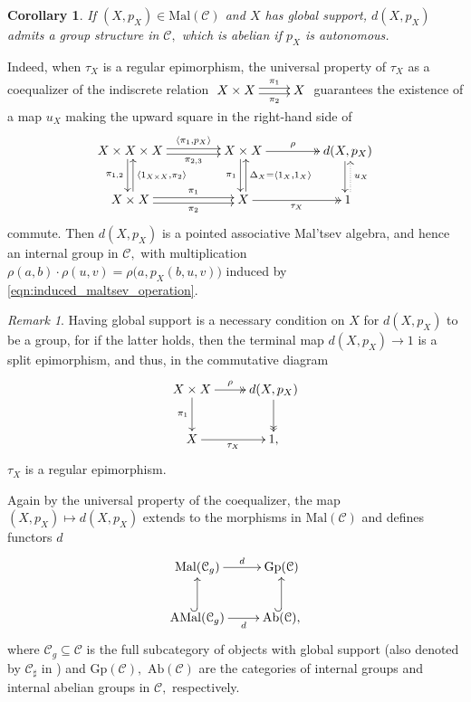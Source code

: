 \documentclass[11pt]{amsart}
\theoremstyle{plain}
\newtheorem{corollary}[subsubsection]{Corollary}
\theoremstyle{definition}
\theoremstyle{remark}
\newtheorem{remark}[subsubsection]{Remark}
\newcommand{\la}{\langle}
\newcommand{\ra}{\rangle}
\begin{document}
\begin{corollary}
If $(X,p_X)\in\mathrm{Mal}(\mathcal{C})$ and $X$ has global support, $d(X,p_X)$ admits a group structure in $\mathcal{C},$ which is abelian if $p_X$ is autonomous.
\end{corollary}
Indeed, when $\tau_X$ is a regular epimorphism, the universal property of $\tau_X$ as a coequalizer of the indiscrete relation $\xymatrix{{X\times X} \ar@<.5ex>[r]^-{\pi_1} \ar@<-.5ex>[r]_-{\pi_2} &{X}}$ guarantees the existence of a map $u_X$ making the upward square in the right-hand side of
\begin{equation*}
\xymatrixcolsep{3.5pc}
\xymatrix{
{X\times X\times X} \ar@<-.5ex>[d]_-{\pi_{1,2}} \ar@<.5ex>[r]^-{\langle \pi_1,p_X\rangle} \ar@<-.5ex>[r]_-{\pi_{2,3}} &{X\times X} \ar@<-.5ex>[d]_-{\pi_1} \ar@{->>}[r]^-{\rho} &{d(X,p_X)} \ar@<-.5ex>[d] \\
{X\times X} \ar@<-.5ex>[u]_-{\la 1_{X\times X},\pi_2 \ra} \ar@<.5ex>[r]^-{\pi_1} \ar@<-.5ex>[r]_-{\pi_2} &X \ar@<-.5ex>[u]_-{\Delta_X=\langle 1_X,1_X\rangle} \ar@{->>}[r]_-{\tau_X} &{1} \ar@{.>}@<-.5ex>[u]_-{u_X}
}
\end{equation*}
commute. Then $d(X,p_X)$ is a pointed associative Mal'tsev algebra, and hence an internal group in $\mathcal{C},$ with multiplication $\rho(a,b)\cdot \rho(u,v)=\rho\big(a,p_X(b,u,v)\big)$ induced by \eqref{eqn:induced_maltsev_operation}.

\begin{remark}
Having global support is a necessary condition on $X$ for $d(X,p_X)$ to be a group, for if the latter holds, then the terminal map $d(X,p_X)\rightarrow 1$ is a split epimorphism, and thus, in the commutative diagram
\[
\xymatrix{
{X\times X} \ar[d]_-{\pi_1} \ar@{->>}[r]^-{\rho} &{d(X,p_X)} \ar@{->>}[d] \\
{X} \ar[r]_-{\tau_X} &{1,}
}
\]
$\tau_X$ is a regular epimorphism.
\end{remark}

Again by the universal property of the coequalizer, the map $(X,p_X)\mapsto d(X,p_X)$ extends to the morphisms in $\mathrm{Mal}(\mathcal{C})$ and defines functors $d$
\begin{equation}
\begin{aligned}
\label{eqn:dir_funs}
\xymatrix{
{\mathrm{Mal}(\mathcal{C}_g)} \ar[r]^-d &{\mathrm{Gp}(\mathcal{C})} \\
{\mathrm{AMal}(\mathcal{C}_g)} \ar[r]_-d \ar@{^{(}->}[u] &{\mathrm{Ab}(\mathcal{C}),} \ar@{^{(}->}[u]
}
\end{aligned}
\end{equation}
where $\mathcal{C}_g\subseteq\mathcal{C}$ is the full subcategory of objects with global support (also denoted by $\mathcal{C}_{\sharp}$ in \cite{bourn-rodelo}) and $\mathrm{Gp}(\mathcal{C}),$ $\mathrm{Ab}(\mathcal{C})$ are the categories of internal groups and internal abelian groups in $\mathcal{C},$ respectively.
\end{document}

